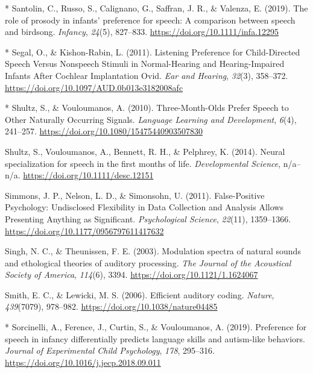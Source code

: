 \documentclass[man]{apa6}
\begin{document}
\hypertarget{ref-santolin_role_2019}{}
{*} Santolin, C., Russo, S., Calignano, G., Saffran, J. R., \& Valenza,
E. (2019). The role of prosody in infants' preference for speech: A
comparison between speech and birdsong. \emph{Infancy}, \emph{24}(5),
827--833. \url{https://doi.org/10.1111/infa.12295}

\hypertarget{ref-segal_listening_2011}{}
{*} Segal, O., \& Kishon-Rabin, L. (2011). Listening Preference for
Child-Directed Speech Versus Nonspeech Stimuli in Normal-Hearing and
Hearing-Impaired Infants After Cochlear Implantation Ovid. \emph{Ear and
Hearing}, \emph{32}(3), 358--372.
\url{https://doi.org/10.1097/AUD.0b013e3182008afc}

\hypertarget{ref-shultz_three-month-olds_2010}{}
{*} Shultz, S., \& Vouloumanos, A. (2010). Three-Month-Olds Prefer
Speech to Other Naturally Occurring Signals. \emph{Language Learning and
Development}, \emph{6}(4), 241--257.
\url{https://doi.org/10.1080/15475440903507830}

\hypertarget{ref-shultz_neural_2014}{}
Shultz, S., Vouloumanos, A., Bennett, R. H., \& Pelphrey, K. (2014).
Neural specialization for speech in the first months of life.
\emph{Developmental Science}, n/a--n/a.
\url{https://doi.org/10.1111/desc.12151}

\hypertarget{ref-simmons_false-positive_2011}{}
Simmons, J. P., Nelson, L. D., \& Simonsohn, U. (2011). False-Positive
Psychology: Undisclosed Flexibility in Data Collection and Analysis
Allows Presenting Anything as Significant. \emph{Psychological Science},
\emph{22}(11), 1359--1366.
\url{https://doi.org/10.1177/0956797611417632}

\hypertarget{ref-singh_modulation_2003}{}
Singh, N. C., \& Theunissen, F. E. (2003). Modulation spectra of natural
sounds and ethological theories of auditory processing. \emph{The
Journal of the Acoustical Society of America}, \emph{114}(6), 3394.
\url{https://doi.org/10.1121/1.1624067}

\hypertarget{ref-smith_efficient_2006}{}
Smith, E. C., \& Lewicki, M. S. (2006). Efficient auditory coding.
\emph{Nature}, \emph{439}(7079), 978--982.
\url{https://doi.org/10.1038/nature04485}

\hypertarget{ref-sorcinelli_preference_2019}{}
{*} Sorcinelli, A., Ference, J., Curtin, S., \& Vouloumanos, A. (2019).
Preference for speech in infancy differentially predicts language skills
and autism-like behaviors. \emph{Journal of Experimental Child
Psychology}, \emph{178}, 295--316.
\url{https://doi.org/10.1016/j.jecp.2018.09.011}
\end{document}
